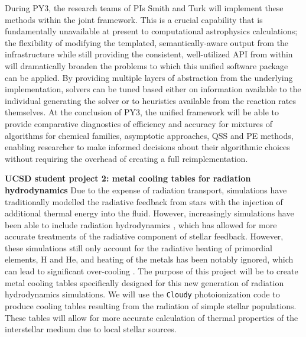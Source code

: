 During PY3, the research teams of PIs Smith and Turk will implement these
methods within the joint framework.  This is a crucial capability that is
fundamentally unavailable at present to computational astrophysics
calculations; the flexibility of modifying the templated, semantically-aware
output from the \dengo{} infrastructure while still providing the consistent,
well-utilized API from within \grackle{} will dramatically broaden the problems
to which this unified software package can be applied.  By providing multiple
layers of abstraction from the underlying implementation, solvers can be tuned
based either on information available to the individual generating the solver
or to heuristics available from the reaction rates themselves.  At the
conclusion of PY3, the unified framework will be able to provide comparative
diagnostics of efficiency and accuracy for mixtures of algorithms for chemical
families, asymptotic approaches, QSS and PE methods, enabling researcher to
make informed decisions about their algorithmic choices without requiring the
overhead of creating a full reimplementation.

\noindent \textbf{UCSD student project 2: metal cooling
  tables for radiation hydrodynamics}
Due to the expense of radiation transport, simulations have
traditionally modelled the radiative feedback from stars with the
injection of additional thermal energy into the fluid.  However,
increasingly simulations have been able to include radiation
hydrodynamics \citep{2012MNRAS.427..311W, Xu_2013, Wise_2014,
2015ApJ...807L..12O}, which has allowed for more accurate treatments of the
radiative component of stellar feedback.  However, these simulations
still only account for the radiative heating of primordial elements, H
and He, and heating of the metals has been notably ignored, which can
lead to significant over-cooling \citep{2011MNRAS.413..190T,
  2012MNRAS.427..311W}.  The purpose of this project will be to create
metal cooling tables specifically designed for this new generation of
radiation hydrodynamics simulations.  We will use the \texttt{Cloudy}
photoionization code to produce cooling tables resulting from the
radiation of simple stellar populations.  These tables will allow for
more accurate calculation of thermal properties of the interstellar
medium due to local stellar sources.




